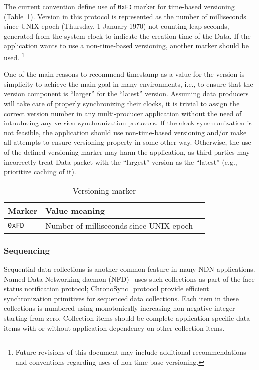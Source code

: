 The current convention define use of \verb|0xFD| marker for time-based versioning (Table~\ref{tab:versioning}).
Version in this protocol is represented as the number of milliseconds since UNIX epoch (Thursday, 1 January 1970) not counting leap seconds, generated from the system clock to indicate the creation time of the Data.
If the application wants to use a non-time-based versioning, another marker should be used.%
\footnote{Future revisions of this document may include additional recommendations and conventions regarding uses of non-time-base versioning.}

One of the main reasons to recommend timestamp as a value for the version is simplicity to achieve the main goal in many environments, i.e., to ensure that the version component is ``larger'' for the ``latest'' version.
Assuming data producers will take care of properly synchronizing their clocks, it is trivial to assign the correct version number in any multi-producer application without the need of introducing any version synchronization protocols.
If the clock synchronization is not feasible, the application should use non-time-based versioning and/or make all attempts to ensure versioning property in some other way.
Otherwise, the use of the defined versioning marker may harm the application, as third-parties may incorrectly treat Data packet with the ``largest'' version as the ``latest'' (e.g., prioritize caching of it).

\begin{table}[h!]
  \centering
  \caption{Versioning marker}
  \label{tab:versioning}
  \begin{tabular}{|l|l|l|}
    \hline
    Marker & Value meaning \\
    \hline \hline
    \verb|0xFD| & Number of milliseconds since UNIX epoch \\
    \hline
  \end{tabular}
\end{table}


\subsubsection{Sequencing}
\label{sec:sequencing}

Sequential data collections is another common feature in many NDN applications.
Named Data Networking daemon (NFD)~\cite{nfd} uses such collections as part of the face status notification protocol; ChronoSync~\cite{ChronoSync} protocol provide efficient synchronization primitives for sequenced data collections.
Each item in these collections is numbered using monotonically increasing non-negative integer starting from zero.
Collection items should be complete application-specific data items with or without application dependency on other collection items.

